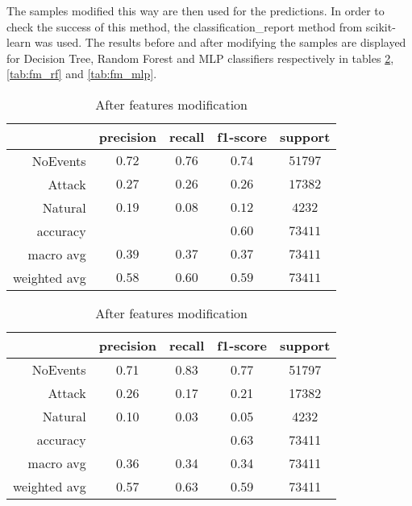 The samples modified this way are then used for the predictions. In order to check the success of this method, the classification\_report method from scikit-learn was used. The results before and after modifying the samples are displayed for Decision Tree, Random Forest and MLP classifiers respectively in tables \ref{tab:fm_dt}, \ref{tab:fm_rf} and \ref{tab:fm_mlp}.

\begin{table}[H]
    \centering
    \footnotesize
    \caption{Features modification results for Decision Tree classifier} \label{tab:fm_dt}
    \begin{subtable}[t]{.5\linewidth}
        \centering
        \caption{Before features modification} 
        \begin{tabular}{rcccc}\toprule
            & precision    &recall & f1-score  & support \\\midrule
                NoEvents  &   $  0.72 $  &  $ 0.76 $  &  $ 0.74 $  & $ 51797 $\\
                  Attack   &  $  0.27 $   & $ 0.26 $  &  $ 0.26 $  & $ 17382 $\\
                 Natural   &  $  0.19 $   & $ 0.08 $  &  $ 0.12 $  & $  4232 $\\
                accuracy   &            &          &  $0.60$  &   $73411$ \\
               macro avg   &  $  0.39 $   & $ 0.37 $  &  $ 0.37 $  & $ 73411 $\\
            weighted avg   &  $  0.58 $  &  $ 0.60 $  &  $ 0.59 $ &  $ 73411 $\\\bottomrule
        \end{tabular}
    \end{subtable}%
    \begin{subtable}[t]{.5\linewidth}
        \centering
        \caption{After features modification}
        \begin{tabular}{rcccc}\toprule
            &precision   & recall & f1-score &  support  \\\midrule
    
            NoEvents   &    0.71   &   0.83  &    0.77   &  51797 \\
              Attack    &   0.26   &   0.17  &    0.21   &  17382 \\
             Natural   &    0.10   &   0.03   &   0.05  &    4232 \\
        
            accuracy    &          &          &   0.63   &  73411 \\
           macro avg    &   0.36   &   0.34   &   0.34   &  73411 \\
        weighted avg     &  0.57   &   0.63   &   0.59   &  73411    \\     \bottomrule   
        \end{tabular}
    \end{subtable}
\end{table}

